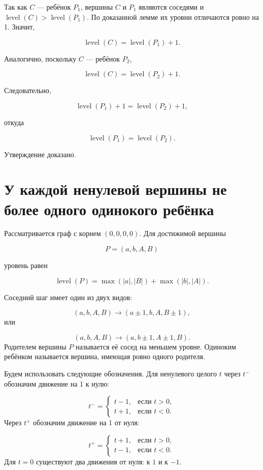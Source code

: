 Так как $C$ --- ребёнок $P_1$, вершины $C$ и $P_1$ являются соседями и
$\operatorname{level}(C) > \operatorname{level}(P_1)$. По доказанной лемме их уровни отличаются ровно
на 1. Значит,

$$
\operatorname{level}(C) = \operatorname{level}(P_1) + 1.
$$

Аналогично, поскольку $C$ --- ребёнок $P_2$,

$$
\operatorname{level}(C) = \operatorname{level}(P_2) + 1.
$$

Следовательно,

$$
\operatorname{level}(P_1) + 1 = \operatorname{level}(P_2) + 1,
$$

откуда

$$
\operatorname{level}(P_1) = \operatorname{level}(P_2).
$$

Утверждение доказано.

\section{У каждой ненулевой вершины не более одного одинокого ребёнка}

Рассматривается граф с корнем $(0,0,0,0)$. Для достижимой вершины

$$
P = (a,b,A,B)
$$

уровень равен

$$
\operatorname{level}(P) = \max(|a|,|B|) + \max(|b|,|A|).
$$

Соседний шаг имеет один из двух видов:

$$(a,b,A,B)\to(a\pm1,b,A,B\pm1),
$$
или

$$(a,b,A,B)\to(a,b\pm1,A\pm1,B).
$$
Родителем вершины $P$ называется её сосед на меньшем уровне. Одиноким
ребёнком называется вершина, имеющая ровно одного родителя.

Будем использовать следующие обозначения. Для ненулевого целого $t$
через $t^{-}$ обозначим движение на 1 к нулю:

$$t^{-}=\begin{cases}
t-1, & \text{если }t>0,\\
t+1, & \text{если }t<0.
\end{cases}
$$
Через $t^{+}$ обозначим движение на 1 от нуля:

$$t^{+}=\begin{cases}
t+1, & \text{если }t>0,\\
t-1, & \text{если }t<0.
\end{cases}
$$
Для $t=0$ существуют два движения от нуля: к $1$ и к $-1$.

